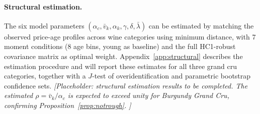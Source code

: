 \paragraph{Structural estimation.}
The six model parameters
$(\alpha_{c}, \bar{v}_{k}, \alpha_{k}, \gamma, \delta,
\bar{\lambda})$ can be estimated by matching the observed price-age
profiles across wine categories using minimum distance, with 7
moment conditions (8 age bins, young as baseline) and the full
HC1-robust covariance matrix as optimal weight.
Appendix~\ref{app:structural} describes the estimation procedure and
will report these estimates for all three grand cru categories, together
with a $J$-test of overidentification and parametric bootstrap
confidence sets.
\textit{[Placeholder: structural estimation results to be completed.
The estimated $\rho = \bar{v}_{k}/\alpha_{c}$ is expected to exceed
unity for Burgundy Grand Cru, confirming Proposition~\ref{prop:notrough}.
]}
